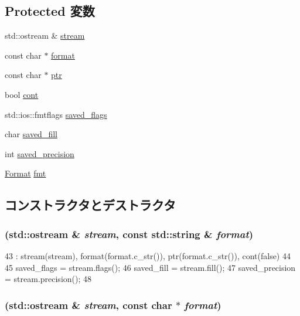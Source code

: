 \subsection*{Protected 変数}
\begin{DoxyCompactItemize}
\item 
std::ostream \& \hyperlink{structcp_1_1Print_aeacb68b8c7e9ae9b97ab9c6ab41940cb}{stream}
\item 
const char $\ast$ \hyperlink{structcp_1_1Print_a6bd2bb5fcc7628a640958994a22f997c}{format}
\item 
const char $\ast$ \hyperlink{structcp_1_1Print_a35de73b2bf3f7b4e96f38f4c7ff85b26}{ptr}
\item 
bool \hyperlink{structcp_1_1Print_a3f7d640f7eaaa11a888cb98ec1816e28}{cont}
\item 
std::ios::fmtflags \hyperlink{structcp_1_1Print_ab596cd0773ceeffee59a2988768c7fb0}{saved\_\-flags}
\item 
char \hyperlink{structcp_1_1Print_a5fbcf9cf4d309f66f61f423eb2edc2f3}{saved\_\-fill}
\item 
int \hyperlink{structcp_1_1Print_ace88513f3f4c11ac821a4ec110ecdfc4}{saved\_\-precision}
\item 
\hyperlink{structcp_1_1Format}{Format} \hyperlink{structcp_1_1Print_afdcbc01123b620b7cef57d09f7c8187a}{fmt}
\end{DoxyCompactItemize}


\subsection{コンストラクタとデストラクタ}
\hypertarget{structcp_1_1Print_a259002c581889b88e75dd96c5d20e3f9}{
\subsubsection[{Print}]{ (std::ostream \& {\em stream}, \/  const std::string \& {\em format})}}
\label{structcp_1_1Print_a259002c581889b88e75dd96c5d20e3f9}



\begin{DoxyCode}
43     : stream(stream), format(format.c_str()), ptr(format.c_str()), cont(false)
44 {
45     saved_flags = stream.flags();
46     saved_fill = stream.fill();
47     saved_precision = stream.precision();
48 }
\end{DoxyCode}
\hypertarget{structcp_1_1Print_a1921a2904d61acd5e33435e425be63ae}{
\subsubsection[{Print}]{ (std::ostream \& {\em stream}, \/  const char $\ast$ {\em format})}}
\label{structcp_1_1Print_a1921a2904d61acd5e33435e425be63ae}



